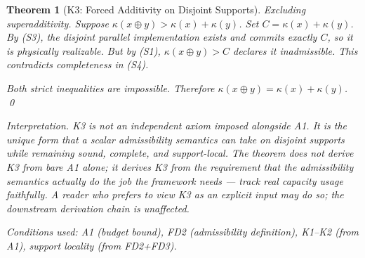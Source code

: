 \documentclass[11pt,a4paper]{article}
\newtheorem{theorem}{Theorem}[section]
\theoremstyle{definition}
\begin{document}
\begin{theorem}[K3: Forced Additivity on Disjoint Supports]
\textit{Excluding superadditivity.}  Suppose $\kappa(x \oplus y) > \kappa(x) + \kappa(y)$.  Set $C = \kappa(x) + \kappa(y)$.  By (S3), the disjoint parallel implementation exists and commits exactly $C$, so it is physically realizable.  But by (S1), $\kappa(x \oplus y) > C$ declares it inadmissible.  This contradicts completeness in (S4).

Both strict inequalities are impossible.  Therefore $\kappa(x \oplus y) = \kappa(x) + \kappa(y)$.  \qed

\smallskip\noindent\textit{Interpretation.}  K3 is not an independent axiom imposed alongside A1.  It is the \emph{unique} form that a scalar admissibility semantics can take on disjoint supports while remaining sound, complete, and support-local.  The theorem does not derive K3 from bare A1 alone; it derives K3 from the requirement that the admissibility semantics actually do the job the framework needs --- track real capacity usage faithfully.  A reader who prefers to view K3 as an explicit input may do so; the downstream derivation chain is unaffected.

\noindent\textit{Conditions used:} A1 (budget bound), FD2 (admissibility definition), K1--K2 (from A1), support locality (from FD2+FD3).
\end{theorem}
\end{document}
